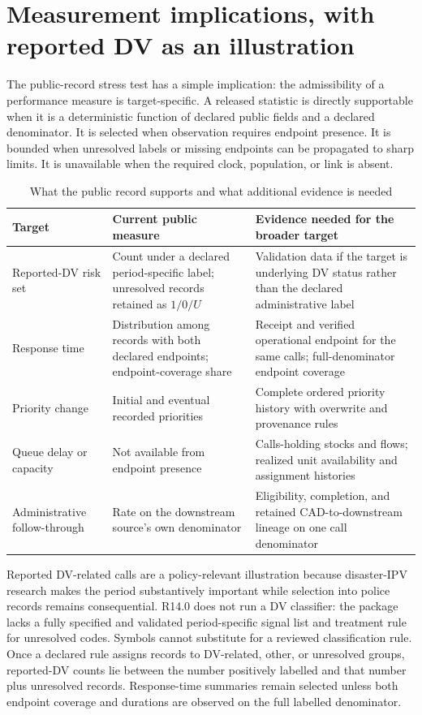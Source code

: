 \documentclass[11pt]{article}
\begin{document}
\section{Measurement implications, with reported DV as an illustration}

The public-record stress test has a simple implication: the admissibility of a performance measure is target-specific. A released statistic is directly supportable when it is a deterministic function of declared public fields and a declared denominator. It is selected when observation requires endpoint presence. It is bounded when unresolved labels or missing endpoints can be propagated to sharp limits. It is unavailable when the required clock, population, or link is absent.

\begin{table}[t]
\centering
\caption{What the public record supports and what additional evidence is needed}
\label{tab:frontier}
\begin{tabularx}{\textwidth}{@{}p{}p{}X@{}}
\toprule
Target & Current public measure & Evidence needed for the broader target \\
\midrule
Reported-DV risk set & Count under a declared period-specific label; unresolved records retained as $1/0/U$ & Validation data if the target is underlying DV status rather than the declared administrative label \\
Response time & Distribution among records with both declared endpoints; endpoint-coverage share & Receipt and verified operational endpoint for the same calls; full-denominator endpoint coverage \\
Priority change & Initial and eventual recorded priorities & Complete ordered priority history with overwrite and provenance rules \\
Queue delay or capacity & Not available from endpoint presence & Calls-holding stocks and flows; realized unit availability and assignment histories \\
Administrative follow-through & Rate on the downstream source's own denominator & Eligibility, completion, and retained CAD-to-downstream lineage on one call denominator \\
\bottomrule
\end{tabularx}
\end{table}

Reported DV-related calls are a policy-relevant illustration because disaster-IPV research makes the period substantively important while selection into police records remains consequential. R14.0 does not run a DV classifier: the package lacks a fully specified and validated period-specific signal list and treatment rule for unresolved codes. Symbols cannot substitute for a reviewed classification rule. Once a declared rule assigns records to DV-related, other, or unresolved groups, reported-DV counts lie between the number positively labelled and that number plus unresolved records. Response-time summaries remain selected unless both endpoint coverage and durations are observed on the full labelled denominator.
\end{document}
